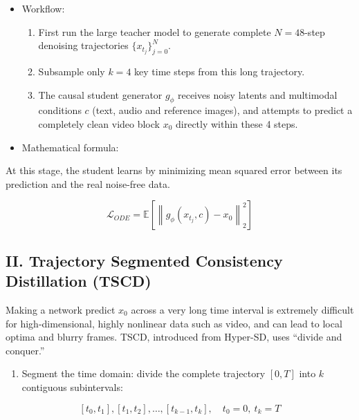 \begin{itemize}
\tightlist
\item
{}
  Workflow:

  \begin{enumerate}
  \def\labelenumi{\arabic{enumi}.}
  \tightlist
  \item
    First run the large teacher model to generate complete \(N=48\)-step denoising trajectories \(\{x_{t_j}\}_{j=0}^{N}\).
  \item
    Subsample only \(k=4\) key time steps from this long trajectory.
  \item
    The causal student generator \(g_\phi\) receives noisy latents and multimodal conditions \(c\) (text, audio and reference images), and attempts to predict a completely clean video block \(x_0\) directly within these 4 steps.
  \end{enumerate}
\item
{}
  Mathematical formula:
\end{itemize}

At this stage, the student learns by minimizing mean squared error between its prediction and the real noise-free data.

\[
\mathcal{L}_{ODE}=\mathbb{E}\left[\left\|g_\phi(x_{t_j},c)-x_0\right\|_2^2\right]
\]

\hypertarget{ii.-trajectory-segmented-consistency-distillation-tscd}{%
\subsection{II. Trajectory Segmented Consistency Distillation (TSCD)}\label{ii.-trajectory-segmented-consistency-distillation-tscd}}

Making a network predict \(x_0\) across a very long time interval is extremely difficult for high-dimensional, highly nonlinear data such as video, and can lead to local optima and blurry frames. TSCD, introduced from Hyper-SD, uses ``divide and conquer.''

\begin{enumerate}
\def\labelenumi{\arabic{enumi}.}
\tightlist
\item
{}
  Segment the time domain: divide the complete trajectory \([0,T]\) into \(k\) contiguous subintervals:
\end{enumerate}

\[
[t_0,t_1],[t_1,t_2],\ldots,[t_{k-1},t_k],\quad t_0=0,\ t_k=T
\]

